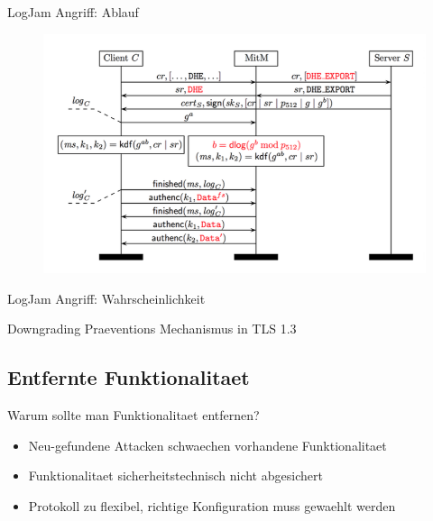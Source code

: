 \documentclass{f4_beamer_metropolis}
\begin{document}
\begin{frame}{LogJam Angriff: Ablauf}
  \begin{figure}[!h]
    \centering
    \vspace*{-0.35cm}
    \includegraphics[scale=0.8]{./images/logjam.png}
    \label{fig:logjam}
    \autocite{logjam}
  \end{figure}
\end{frame}

\begin{frame}{LogJam Angriff: Wahrscheinlichkeit}

\end{frame}

\begin{frame}{Downgrading Praeventions Mechanismus in TLS 1.3}

\end{frame}

\subsection{Entfernte Funktionalitaet}

\begin{frame}{Warum sollte man Funktionalitaet entfernen?}
  \begin{overlayarea}{\textwidth}{.5\textheight}
  \begin{itemize}
    \item<2-> Neu-gefundene Attacken schwaechen vorhandene Funktionalitaet
    \item<3-> Funktionalitaet sicherheitstechnisch nicht abgesichert
    \item<4-> Protokoll zu flexibel, richtige Konfiguration muss gewaehlt werden
    \end{itemize}
  \end{overlayarea}

\end{frame}
\end{document}
